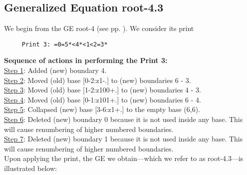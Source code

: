 \documentclass[final]{article}
\begin{document}
\subsection*{Generalized Equation root-4.3}
\label{root-4.3}We begin from the GE root-4 (see pp. \pageref{root-4}).  {We consider its print}
\begin{verbatim}
     Print 3: =0=5*<4*<1<2=3*
\end{verbatim}
{\bf Sequence of actions in performing the Print 3:}\\
{\underline{Step 1}:} Added (new) boundary 4.\\
{\underline{Step 2}:} Moved (old) base [0-2:z1-.]  to (new) boundaries 6 - 3.\\
{\underline{Step 3}:} Moved (old) base [1-2:z100+.]  to (new) boundaries 4 - 3.\\
{\underline{Step 4}:} Moved (old) base [0-1:z101+.]  to (new) boundaries 6 - 4.\\
{\underline{Step 5}:} Collapsed (new) base [3-6:z1+.]  to the empty base (6,6).
\\
{\underline{Step 6}:} Deleted (new) boundary 0 because it is not used inside any base.  This will cause renumbering of higher numbered boundaries.
\\
{\underline{Step 7}:} Deleted (new) boundary 1 because it is not used inside any base.  This will cause renumbering of higher numbered boundaries.
\\[0.1in]
{Upon applying the print, the GE we obtain---which we refer to as root-4.3---is illustrated below:}
\end{document}
